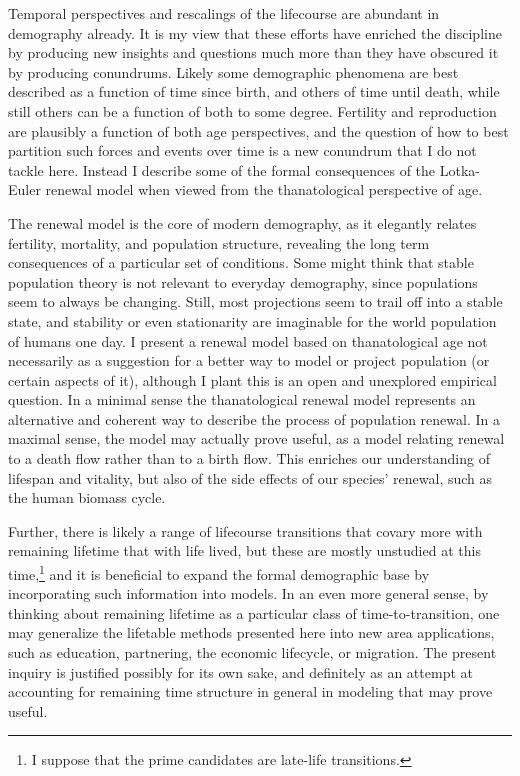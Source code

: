 \documentclass{article}
\begin{document}
Temporal perspectives and rescalings of the lifecourse are abundant in
demography already. It is my view that these efforts have enriched the
discipline by producing new insights and questions much more than they have obscured it by
producing conundrums. Likely some demographic phenomena are best
described as a function of time since birth, and others of time until death,
while still others can be a function of both to some degree. Fertility and
reproduction are plausibly a function of both age perspectives, and the question
of how to best partition such forces and events over time is a new conundrum
that I do not tackle here. Instead I describe some of the formal consequences
of the Lotka-Euler renewal model when viewed from the thanatological perspective
of age. 

The renewal model is the core of modern demography, as it elegantly relates
fertility, mortality, and population structure, revealing the long
term consequences of a particular set of conditions. Some might think that
stable population theory is not relevant to everyday demography, since
populations seem to always be changing. Still, most projections seem to trail
off into a stable state, and stability or even stationarity are
imaginable for the world population of humans one day. I present a renewal model
based on thanatological age not necessarily as a suggestion for a
better way to model or project population (or certain aspects of it), although I
plant this is an open and unexplored empirical question.
In a minimal sense the thanatological renewal model represents an alternative
and coherent way to describe the process of population renewal. In a maximal sense, the model may
actually prove useful, as a model relating renewal to a death flow rather than
to a birth flow. This enriches our understanding of lifespan and vitality, but also
of the side effects of our species' renewal, such as the human biomass cycle.

Further, there is likely a range of lifecourse transitions that covary
more with remaining lifetime that with life lived, but these are mostly unstudied at this
time,\footnote{I suppose that the prime candidates are late-life transitions.}
and it is beneficial to expand the formal demographic base by incorporating such information into models. In an even more general sense, by
thinking about remaining lifetime as a particular class of time-to-transition, one may generalize the lifetable methods presented here into new area
applications, such as education, partnering, the economic lifecycle, or
migration.
The present inquiry is justified possibly for its own sake, and definitely as an
attempt at accounting for remaining time structure in general in modeling that may prove useful.
\end{document}
